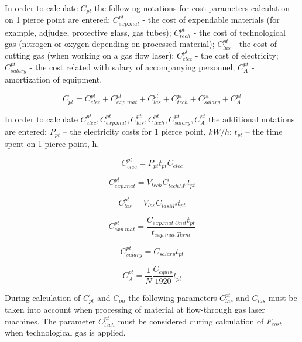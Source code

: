 \documentclass[runningheads]{llncs}
\begin{document}
In order to calculate $C_{pt}$
the following notations for cost parameters calculation on 1 pierce point are entered:
$C^{pt}_{exp.mat}$ - the cost of expendable materials
(for example, adjudge, protective glass, gas tubes);
$C^{pt}_{tech}$ - the cost of technological gas
(nitrogen or oxygen depending on processed material);
$C^{pt}_{las}$ - the cost of cutting gas
(when working on a gas flow laser);
$C^{pt}_{elec}$ - the cost of electricity;
$C^{pt}_{salary}$ - the cost related with salary of accompanying personnel;
$C^{pt}_A$ - amortization of equipment.

\begin{equation}
  \label{eq1.11}
  C_{pt}
  = C^{pt}_{elec}
  + C^{pt}_{exp.mat}
  + C^{pt}_{las}
  + C^{pt}_{tech}
  + C^{pt}_{salary}
  + C^{pt}_A
\end{equation}

In order to calculate $C^{pt}_{elec}, C^{pt}_{exp.mat}, C^{pt}_{las}, C^{pt}_{tech},
C^{pt}_{salary}, C^{pt}_A$
the additional notations are entered:
$P_{pt}$ – the electricity costs for 1 pierce point, $kW/h$;
$t_{pt}$  – the time spent on 1 pierce point, h.

\begin{equation}
  \label{eq1.12}
  C^{pt}_{elec} = P_{pt} t_{pt} C_{elec}
\end{equation}

\begin{equation}
  \label{eq1.13}
  C^{pt}_{exp.mat} = V_{tech} C_{tech M^3} t_{pt}
\end{equation}

\begin{equation}
  \label{eq1.14}
  C^{pt}_{las} = V_{las} C_{las M^3} t_{pt}
\end{equation}

\begin{equation}
  \label{eq1.15}
  C^{pt}_{exp.mat} = \frac{C_{exp.mat.Unit} t_{pt}}{t_{exp.mat.Term}}
\end{equation}

\begin{equation}
  \label{eq1.16}
  C^{pt}_{salary} = C_{salary} t_{pt}
\end{equation}

\begin{equation}
  \label{eq1.17}
  C^{pt}_A = \frac{1}N \frac{C_{equip}}{1920} t_{pt}
\end{equation}

During calculation of $C_{pt}$
and $C_{on}$
the following parameters $C^{pt}_{las}$
and $C_{las}$ must be taken into account
when processing of material at flow-through gas laser machines.
The parameter $C^{pt}_{tech}$
must be considered during calculation of $F_{cost}$
when technological gas is applied.
\end{document}

